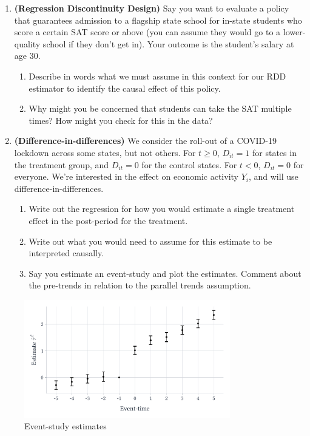\documentclass[12pt]{article}
\begin{document}
\begin{enumerate}
  \newpage
  \item \textbf{(Regression Discontinuity Design)} Say you want to evaluate a policy that guarantees admission to a flagship state school for in-state students who score a certain SAT score or above (you can assume they would go to a lower-quality school if they don't get in). Your outcome is the student's salary at age 30.
  \begin{enumerate}[leftmargin = 2em]
    \item Describe in words what we must assume in this context for our RDD estimator to identify the causal effect of this policy. 
    
    \item Why might you be concerned that students can take the SAT multiple times? How might you check for this in the data?
  \end{enumerate}


  \item \textbf{(Difference-in-differences)} We consider the roll-out of a COVID-19 lockdown across some states, but not others. For $t \geq 0$, $D_{it} = 1$ for states in the treatment group, and $D_{it} = 0$ for the control states. For $t < 0$, $D_{it} = 0$ for everyone. We're interested in the effect
  on economic activity $Y_{i}$, and will use difference-in-differences.
  \begin{enumerate}[leftmargin = 2em]
    \item Write out the regression for how you would estimate a single treatment effect in the post-period for the treatment. 
    
    \item Write out what you would need to assume for this estimate to be interpreted causally. 
    
    \item Say you estimate an event-study and plot the estimates. Comment about the pre-trends in relation to the parallel trends assumption.
  \end{enumerate}
\end{enumerate}

\begin{figure}[b!]
  \caption{Event-study estimates}
  \vspace*{-\medskipamount}
  \begin{center}
    \includegraphics[width=0.8\textwidth]{figures/did_bad_pretrends.pdf}
  \end{center}
\end{figure}
\end{document}
